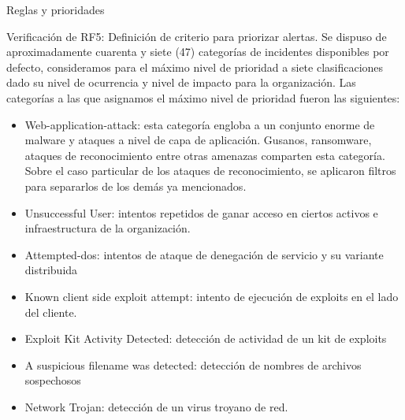 \begin{section}{Reglas y prioridades}
\begin{section}{Verificación de RF5: Definición de criterio para priorizar alertas.}
    Se dispuso de aproximadamente cuarenta y siete (47) categorías de incidentes disponibles por defecto, consideramos para el máximo nivel de prioridad a siete clasificaciones dado su nivel de ocurrencia y nivel de impacto para la organización. Las categorías a las que asignamos el máximo nivel de prioridad fueron las siguientes:
    \begin{itemize}
        \item Web-application-attack: esta categoría engloba a un conjunto enorme de malware y ataques a nivel de capa de aplicación. Gusanos, ransomware, ataques de reconocimiento entre otras amenazas comparten esta categoría. Sobre el caso particular de los ataques de reconocimiento, se aplicaron filtros para separarlos de los demás ya mencionados.
        \item Unsuccessful User: intentos repetidos de ganar acceso en ciertos activos e infraestructura de la organización.
        \item Attempted-dos: intentos de ataque de denegación de servicio y su variante distribuida
        \item Known client side exploit attempt: intento de ejecución de exploits en el lado del cliente.
        \item Exploit Kit Activity Detected: detección de actividad de un kit de exploits
        \item A suspicious filename was detected: detección de nombres de archivos sospechosos
        \item Network Trojan: detección de un virus troyano de red.
    \end{itemize}
    

\end{section}
\end{section}
